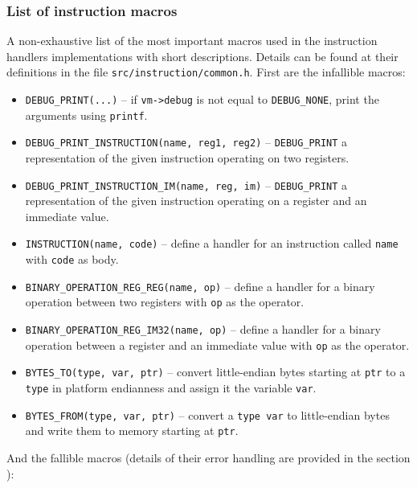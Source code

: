 \documentclass[12pt,a4paper,final]{article}
\newcommand{\code}[1]{\texttt{#1}}
\begin{document}
\subsubsection{List of instruction macros}
\label{sec:macroslist}

A non-exhaustive list of the most important macros used in the instruction
handlers implementations with short descriptions. Details can be found at their
definitions in the file \code{src/instruction/common.h}. First are the
infallible macros:

\begin{itemize}
    \item \code{DEBUG_PRINT(...)} -- if \code{vm->debug} is not equal to
        \code{DEBUG_NONE}, print the arguments using \code{printf}.
    \item \code{DEBUG_PRINT_INSTRUCTION(name, reg1, reg2)} -- \code{DEBUG_PRINT}
        a representation of the given instruction operating on two registers.
    \item \code{DEBUG_PRINT_INSTRUCTION_IM(name, reg, im)} -- \code{DEBUG_PRINT}
        a representation of the given instruction operating on a register and an
        immediate value.

    \item \code{INSTRUCTION(name, code)} -- define a handler for an instruction
        called \code{name} with \code{code} as body.
    \item \code{BINARY_OPERATION_REG_REG(name, op)} -- define a handler for a
        binary operation between two registers with \code{op} as the operator.
    \item \code{BINARY_OPERATION_REG_IM32(name, op)} -- define a handler for a
        binary operation between a register and an immediate value with
        \code{op} as the operator.

    \item \code{BYTES_TO(type, var, ptr)} -- convert little-endian bytes
        starting at \code{ptr} to a \code{type} in platform endianness and
        assign it the variable \code{var}.
    \item \code{BYTES_FROM(type, var, ptr)} -- convert a \code{type var} to
        little-endian bytes and write them to memory starting at \code{ptr}.
\end{itemize}

And the fallible macros (details of their error handling are provided in the
section ):
\end{document}
